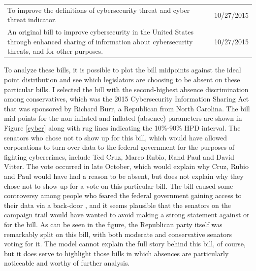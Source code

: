 \begin{table}[h!]
\begin{tabular}{p{6in}l}
		To improve the definitions of cybersecurity threat and cyber threat indicator.                                                                                                                                                           & 10/27/2015 \\
		An original bill to improve cybersecurity in the United States through enhanced sharing of information about cybersecurity threats, and for other purposes.                                                                              & 10/27/2015
	\end{tabular}
\end{table}

To analyze these bills, it is possible to plot the bill midpoints against the ideal point distribution and see which legislators are choosing to be absent on these particular bills. I selected the bill with the second-highest absence discrimination among conservatives, which was the 2015 Cybersecurity Information Sharing Act that was sponsored by Richard Burr, a Republican from North Carolina. The bill mid-points for the non-inflated and inflated (absence) parameters are shown in Figure \ref{cyber} along with rug lines indicating the 10\%-90\% HPD interval. The senators who chose not to show up for this bill, which would have allowed corporations to turn over data to the federal government for the purposes of fighting cybercrimes, include Ted Cruz, Marco Rubio, Rand Paul and David Vitter. The vote occurred in late October, which would explain why Cruz, Rubio and Paul would have had a reason to be absent, but does not explain why they chose not to show up for a vote on this particular bill. The bill caused some controversy among people who feared the federal government gaining access to their data via a back-door \parencite{cisa2015}, and it seems plausible that the senators on the campaign trail would have wanted to avoid making a strong statement against or for the bill. As can be seen in the figure, the Republican party itself was remarkably split on this bill, with both moderate and conservative senators voting for it. The model cannot explain the full story behind this bill, of course, but it does serve to highlight those bills in which absences are particularly noticeable and worthy of further analysis.

